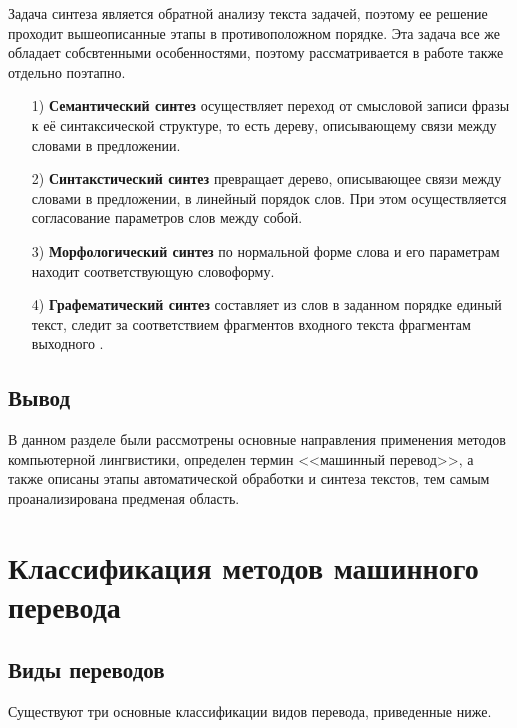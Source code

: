 Задача синтеза является обратной анализу текста задачей, поэтому ее решение проходит вышеописанные этапы в противоположном порядке. Эта задача все же обладает собсвтенными особенностями, поэтому рассматривается в работе также отдельно поэтапно.

\begin{enumerate}
    \item[1)] \textbf{Семантический синтез} осуществляет переход от смысловой записи фразы к её синтаксической структуре, то есть дереву, описывающему связи между словами в предложении.

    \item[2)] \textbf{Синтакстический синтез} превращает дерево, описывающее связи между словами в предложении, в линейный порядок слов. При этом осуществляется согласование параметров слов между собой.
    
    \item[3)] \textbf{Морфологический синтез} по нормальной форме слова и его параметрам находит соответствующую словоформу.
    
    \item[4)] \textbf{Графематический синтез} составляет из слов в заданном порядке единый текст, следит за соответствием фрагментов входного текста фрагментам выходного \cite{klashinskyi}.
\end{enumerate}

\section *{Вывод}

В данном разделе были рассмотрены основные направления применения методов компьютерной лингвистики, определен термин <<машинный перевод>>, а также описаны этапы автоматической обработки и синтеза текстов, тем самым проанализирована предменая область.

\chapter{Классификация методов машинного перевода}

\section{Виды переводов}

Существуют три основные классификации видов перевода, приведенные ниже. 

